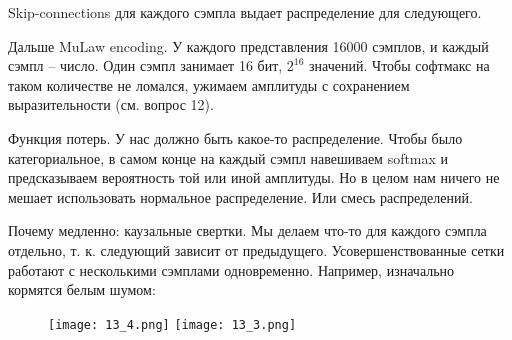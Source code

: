 Skip-connections для каждого сэмпла выдает распределение для следующего.

Дальше MuLaw encoding. У каждого представления 16000 сэмплов, и каждый сэмпл -- число. Один сэмпл занимает 16 бит, $2^{16}$ значений. Чтобы софтмакс на таком количестве не ломался, ужимаем амплитуды с сохранением выразительности (см. вопрос 12).

Функция потерь. У нас должно быть какое-то распределение. Чтобы было категориальное, в самом конце на каждый сэмпл навешиваем softmax и предсказываем вероятность той или иной амплитуды. Но в целом нам ничего не мешает использовать нормальное распределение. Или смесь распределений.

Почему медленно: каузальные свертки. Мы делаем что-то для каждого сэмпла отдельно, т. к. следующий зависит от предыдущего. Усовершенствованные сетки работают с несколькими сэмплами одновременно. Например, изначально кормятся белым шумом:


\begin{figure}[H]
	\texttt{[image: 13\_4.png]}
	\texttt{[image: 13\_3.png]}
	\label{fig:13_3}
\end{figure}
